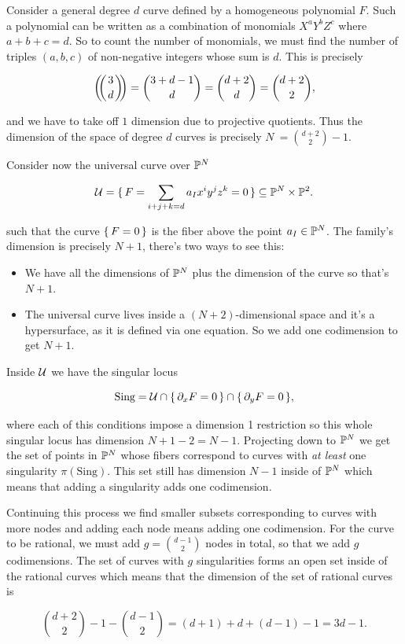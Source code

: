 \documentclass[12pt]{memoir}
\begin{document}
\begin{ptcbp}
    Consider a general degree \(d\) curve defined by a homogeneous polynomial \(F\). Such a polynomial can be written as a combination of monomials \(X^{a}Y^{b}Z^{c}\) where \(a+b+c=d\). So to count the number of monomials, we must find the number of triples \((a,b,c)\) of non-negative integers whose sum is \(d\). This is precisely

    \[\multinom{3}{d}=\binom{3+d-1}{d}=\binom{d+2}{d}=\binom{d+2}{2},\]

    and we have to take off \(1\) dimension due to projective quotients. Thus the dimension of the space of degree \(d\) curves is precisely \(N\:=\binom{d+2}{2}-1\).\par
    Consider now the universal curve over \(\mathbb{P}^N\)

    \[\mathcal{U}=\{\,F=\sum_{i+j+k=d}a_Ix^iy^jz^k=0\,\}\subseteq\mathbb{P}^N\times\mathbb{P}^2.\]

    such that the curve \(\{\,F=0\,\}\) is the fiber above the point \(a_I\in\mathbb{P}^N\). The family's dimension is precisely \(N+1\), there's two ways to see this:
    \begin{itemize}
        \item We have all the dimensions of \(\mathbb{P}^N\) plus the dimension of the curve so that's \(N+1\).
        \item The universal curve lives inside a \((N+2)\)-dimensional space and it's a hypersurface, as it is defined via one equation. So we add one codimension to get \(N+1\).
    \end{itemize}
    Inside \(\mathcal{U}\) we have the singular locus

    \[\text{Sing}=\mathcal{U}\cap\{\,\partial_xF=0\,\}\cap\{\,\partial_yF=0\,\},\]

    where each of this conditions impose a dimension 1 restriction so this whole singular locus has dimension \(N+1-2=N-1\). Projecting down to \(\mathbb{P}^N\) we get the set of points in \(\mathbb{P}^N\) whose fibers correspond to curves with \emph{at least} one singularity \(\pi(\text{Sing})\). This set still has dimension \(N-1\) inside of \(\mathbb{P}^N\) which means that adding a singularity adds one codimension.\par
    Continuing this process we find smaller subsets corresponding to curves with more nodes and adding each node means adding one codimension. For the curve to be rational, we must add \(g=\binom{d-1}{2}\) nodes in total, so that we add \(g\) codimensions. The set of curves with \(g\) singularities forms an open set inside of the rational curves which means that the dimension of the set of rational curves is

    \[\binom{d+2}{2}-1-\binom{d-1}{2}=(d+1)+d+(d-1)-1=3d-1.\]

\end{ptcbp}
\end{document}
